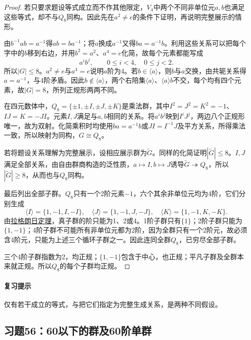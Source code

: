 \documentclass[UTF8,a4paper,11pt,fontset=windows]{ctexart}
\newcommand{\proofref}[2]{\hyperref[note:#1]{#2}}
\newcommand{\exref}[2]{\hyperref[ex:#1:#2]{第#1章习题#2}}
\begin{document}

\begin{proof}
若只要求题设等式成立而不作其他限定，$V_4$中两个不同非单位元$a,b$也满足这些等式，却不与$Q_8$同构。因此先在$a^2\ne e$的条件下证明，再说明完整展示的情形。

由$b^{-1}ab=a^{-1}$得$ab=ba^{-1}$；将$a$换成$a^{-1}$又得$ba=a^{-1}b$。利用这些关系可以把每个字中的$b$移到右边，并用$b^2=a^2$、$a^4=e$化简，故每个元素都能写成
\[
a^ib^j,\qquad0\leq i<4,\quad0\leq j<2.
\]
所以$|G|\leq8$。$a^2\ne e$与$a^4=e$说明$a$阶为4。若$b\in\langle a\rangle$，则$b$与$a$交换，由共轭关系得$a=a^{-1}$，与4阶矛盾。因此$b\notin\langle a\rangle$，两个右陪集$\langle a\rangle$、$\langle a\rangle b$不交，每个均有四个元素，故$|G|=8$，所列正规形两两不同。

在四元数体中，$Q_8=\{\pm1,\pm I,\pm J,\pm K\}$是乘法群，其中$I^2=J^2=K^2=-1$、$IJ=K=-JI$。元素$I,J$满足与$a,b$相同的关系。将$a^ib^j$映到$I^iJ^j$，两边八个正规形唯一，故为双射。化简乘积时均使用$ba=a^{-1}b$或$JI=I^{-1}J$及平方关系，所得乘法一致，所以映射为同构，$G\cong Q_8$。

若将题设关系理解为完整展示，设相应展示群为$\widetilde G$。同样的化简证明$|\widetilde G|\leq8$。$I,J$满足全部关系，由自由群商构造的泛性质，$a\mapsto I,b\mapsto J$诱导$\widetilde G\twoheadrightarrow Q_8$，所以$|\widetilde G|\geq8$，从而也与$Q_8$同构。

最后列出全部子群。$Q_8$只有一个2阶元素$-1$，六个其余非单位元均为4阶，它们分别生成
\[
\langle I\rangle=\{1,-1,I,-I\},\quad
\langle J\rangle=\{1,-1,J,-J\},\quad
\langle K\rangle=\{1,-1,K,-K\}.
\]
由\proofref{lagrange}{拉格朗日定理}，真子群的阶只能为1、2或4。1阶子群只有$\{1\}$；2阶子群只能为$\{1,-1\}$；4阶子群不可能所有非单位元都为2阶，因为全群只有一个2阶元，故必须含4阶元，只能为上述三个循环子群之一。因此连同全群$Q_8$，已穷尽全部子群。

三个4阶子群指数为2，均正规；$\{1,-1\}$包含于中心，也正规；平凡子群及全群本来就正规。所以$Q_8$的每个子群均正规。
\end{proof}

\paragraph{复习提示}
仅有若干成立的等式，与把它们指定为完整生成关系，是两种不同假设。


\subsection{习题56：\texorpdfstring{60以下的群及60阶单群}{60以下的群及60阶单群}}
\label{ex:2:56}
\end{document}
